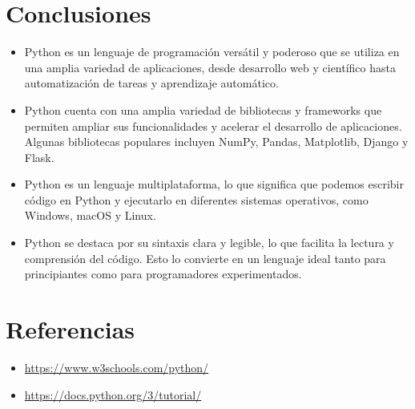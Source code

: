 \documentclass{article}
\begin{document}
 \section{Conclusiones}
	\begin{itemize}
		\item Python es un lenguaje de programación versátil y poderoso que se utiliza en una amplia variedad de aplicaciones, desde desarrollo web y científico hasta automatización de tareas y aprendizaje automático.
		\item Python cuenta con una amplia variedad de bibliotecas y frameworks que permiten ampliar sus funcionalidades y acelerar el desarrollo de aplicaciones. Algunas bibliotecas populares incluyen NumPy, Pandas, Matplotlib, Django y Flask.
		\item Python es un lenguaje multiplataforma, lo que significa que podemos escribir código en Python y ejecutarlo en diferentes sistemas operativos, como Windows, macOS y Linux.
            \item Python se destaca por su sintaxis clara y legible, lo que facilita la lectura y comprensión del código. Esto lo convierte en un lenguaje ideal tanto para principiantes como para programadores experimentados.
	\end{itemize}	
\clearpage

\section{Referencias}
\begin{itemize}			
	\item \url{https://www.w3schools.com/python/}
        \item \url{https://docs.python.org/3/tutorial/}
\end{itemize}	
	
%
%
%
			
\end{document}

